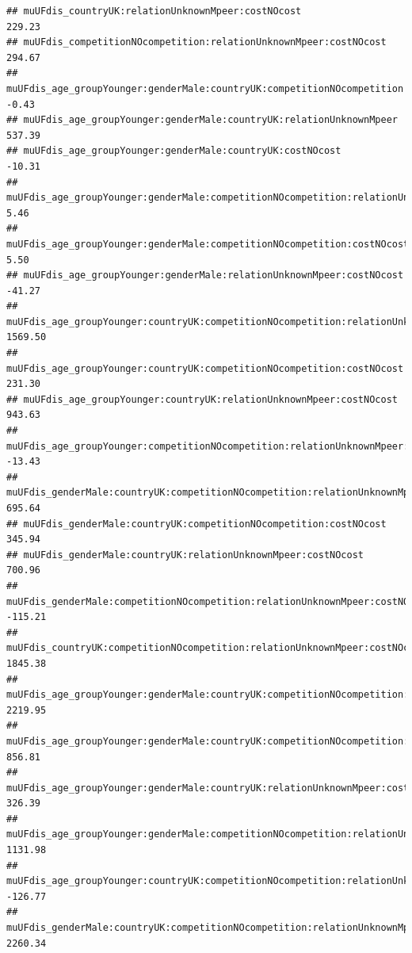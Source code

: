 \documentclass[
]{article}
\begin{document}
\begin{verbatim}
## muUFdis_countryUK:relationUnknownMpeer:costNOcost                                                        229.23
## muUFdis_competitionNOcompetition:relationUnknownMpeer:costNOcost                                         294.67
## muUFdis_age_groupYounger:genderMale:countryUK:competitionNOcompetition                                    -0.43
## muUFdis_age_groupYounger:genderMale:countryUK:relationUnknownMpeer                                       537.39
## muUFdis_age_groupYounger:genderMale:countryUK:costNOcost                                                 -10.31
## muUFdis_age_groupYounger:genderMale:competitionNOcompetition:relationUnknownMpeer                          5.46
## muUFdis_age_groupYounger:genderMale:competitionNOcompetition:costNOcost                                    5.50
## muUFdis_age_groupYounger:genderMale:relationUnknownMpeer:costNOcost                                      -41.27
## muUFdis_age_groupYounger:countryUK:competitionNOcompetition:relationUnknownMpeer                        1569.50
## muUFdis_age_groupYounger:countryUK:competitionNOcompetition:costNOcost                                   231.30
## muUFdis_age_groupYounger:countryUK:relationUnknownMpeer:costNOcost                                       943.63
## muUFdis_age_groupYounger:competitionNOcompetition:relationUnknownMpeer:costNOcost                        -13.43
## muUFdis_genderMale:countryUK:competitionNOcompetition:relationUnknownMpeer                               695.64
## muUFdis_genderMale:countryUK:competitionNOcompetition:costNOcost                                         345.94
## muUFdis_genderMale:countryUK:relationUnknownMpeer:costNOcost                                             700.96
## muUFdis_genderMale:competitionNOcompetition:relationUnknownMpeer:costNOcost                             -115.21
## muUFdis_countryUK:competitionNOcompetition:relationUnknownMpeer:costNOcost                              1845.38
## muUFdis_age_groupYounger:genderMale:countryUK:competitionNOcompetition:relationUnknownMpeer             2219.95
## muUFdis_age_groupYounger:genderMale:countryUK:competitionNOcompetition:costNOcost                        856.81
## muUFdis_age_groupYounger:genderMale:countryUK:relationUnknownMpeer:costNOcost                            326.39
## muUFdis_age_groupYounger:genderMale:competitionNOcompetition:relationUnknownMpeer:costNOcost            1131.98
## muUFdis_age_groupYounger:countryUK:competitionNOcompetition:relationUnknownMpeer:costNOcost             -126.77
## muUFdis_genderMale:countryUK:competitionNOcompetition:relationUnknownMpeer:costNOcost                   2260.34

\end{verbatim}
\end{document}
